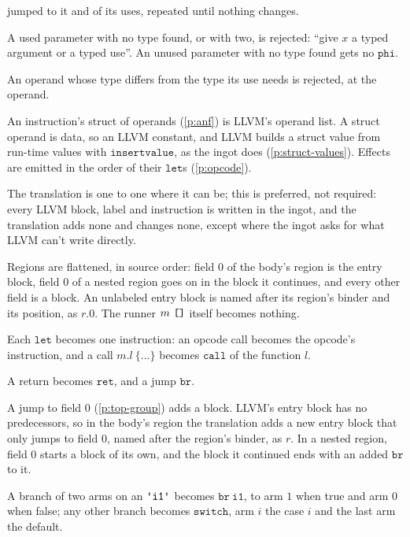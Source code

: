 \documentclass[11pt,letterpaper]{article}
\newcommand{\kw}[1]{\mathtt{#1}}
\newcommand{\str}[1]{\text{\ttfamily\textquotesingle #1\textquotesingle}}  %
\newcommand{\hex}[1]{\text{\ttfamily [#1]}}  %
\newcounter{pt}
\newcommand{\pref}[1]{\ref{#1}}  %
\begin{document}
\begin{points}
  jumped to it and of its uses, repeated until nothing changes.
  \begin{subpoints}
  \item A used parameter with no type found, or with two, is rejected: ``give $x$ a typed argument or a
    typed use''. An unused parameter with no type found gets no $\kw{phi}$.
  \item An operand whose type differs from the type its use needs is rejected, at the operand.
  \end{subpoints}
\item\label{p:llvm-ops} An instruction's struct of operands (\pref{p:anf}) is LLVM's operand list. A struct operand is data,
  so an LLVM constant, and LLVM builds a struct value from run-time values with $\kw{insertvalue}$, as the
  ingot does (\pref{p:struct-values}). Effects are emitted in the order of their $\kw{let}$s (\pref{p:opcode}).
\item\label{p:one-to-one} The translation is one to one where it can be; this is preferred, not required: every LLVM block, label and instruction is
  written in the ingot, and the translation adds none and changes none, except where the ingot asks for
  what LLVM can't write directly.
  \begin{subpoints}
  \item Regions are flattened, in source order: field $0$ of the body's region is the entry block, field $0$ of a
    nested region goes on in the block it continues, and every other field is a block. An unlabeled entry block is
    named after its region's binder and its position, as $r.0$. The runner $m\ \hex{}$ itself becomes nothing.
  \item Each $\kw{let}$ becomes one instruction: an opcode call becomes the opcode's instruction, and a
    call $m.l\ \{\dots\}$ becomes $\kw{call}$ of the function $l$.
  \item A return becomes $\kw{ret}$, and a jump $\kw{br}$.
  \item A jump to field $0$ (\pref{p:top-group}) adds a block. LLVM's entry block has no predecessors, so in the
    body's region the translation adds a new entry block that only jumps to field $0$, named after the region's binder, as $r$. In a nested region, field
    $0$ starts a block of its own, and the block it continued ends with an added $\kw{br}$ to it.
  \item A branch of two arms on an $\str{i1}$ becomes $\kw{br\ i1}$, to arm $1$ when true and arm $0$ when false;
    any other branch becomes $\kw{switch}$, arm $i$ the case $i$ and the last arm the default.

\end{subpoints}
\end{points}
\end{document}
